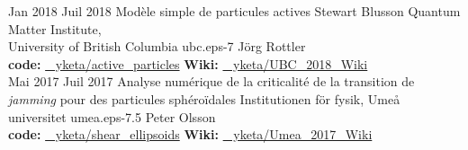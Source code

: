\documentclass[letterpaper]{cvtemplate_fr} %
\begin{document}
\begin{cvbody}
\cvitem
	{Jan 2018}
	{Juil 2018}
	{Mod\`ele simple de particules actives}
  {Stewart Blusson Quantum Matter Institute,\\ University of British Columbia }
  {ubc.eps}{}{-7}
  {J\"org Rottler}
  {\\
  {\bf code:} \href{https://github.com/yketa/active_particles}{\faGithub~ yketa/active\_particles} \hfill {\bf Wiki:} \href{https://yketa.github.io/UBC_2018_Wiki}{\faGithub~ yketa/UBC\_2018\_Wiki}
  }
  \\

\cvitem
	{Mai 2017}
	{Juil 2017}
	{Analyse num\'erique de la criticalit\'e de la transition de \textit{jamming} pour des particules sph\'ero\"idales}
	{Institutionen f\"{o}r fysik, Ume\r{a} universitet }
	{umea.eps}{}{-7.5}
	{Peter Olsson}
	{\\
	{\bf code:} \href{https://github.com/yketa/shear_ellipsoids}{\faGithub~ yketa/shear\_ellipsoids} \hfill {\bf Wiki:} \href{https://yketa.github.io/Umea_2017_Wiki}{\faGithub~ yketa/Umea\_2017\_Wiki}
	}
  \\


\end{cvbody}
\end{document}
